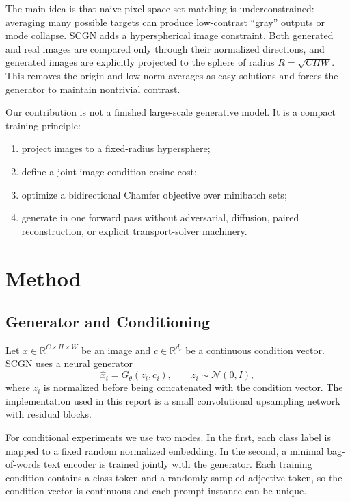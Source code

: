 \documentclass[11pt]{article}
\begin{document}
The main idea is that naive pixel-space set matching is underconstrained:
averaging many possible targets can produce low-contrast ``gray'' outputs or
mode collapse. SCGN adds a hyperspherical image constraint. Both generated and
real images are compared only through their normalized directions, and generated
images are explicitly projected to the sphere of radius
$R=\sqrt{C H W}$. This removes the origin and low-norm averages as easy
solutions and forces the generator to maintain nontrivial contrast.

Our contribution is not a finished large-scale generative model. It is a compact
training principle:
\begin{enumerate}
    \item project images to a fixed-radius hypersphere;
    \item define a joint image-condition cosine cost;
    \item optimize a bidirectional Chamfer objective over minibatch sets;
    \item generate in one forward pass without adversarial, diffusion, paired
    reconstruction, or explicit transport-solver machinery.
\end{enumerate}

\section{Method}
\subsection{Generator and Conditioning}
Let $x \in \mathbb{R}^{C \times H \times W}$ be an image and
$c \in \mathbb{R}^{d_c}$ be a continuous condition vector. SCGN uses a neural
generator
\begin{equation}
    \hat{x}_i = G_\theta(z_i, c_i),
    \qquad z_i \sim \mathcal{N}(0,I),
\end{equation}
where $z_i$ is normalized before being concatenated with the condition vector.
The implementation used in this report is a small convolutional upsampling
network with residual blocks.

For conditional experiments we use two modes. In the first, each class label is
mapped to a fixed random normalized embedding. In the second, a minimal
bag-of-words text encoder is trained jointly with the generator. Each training
condition contains a class token and a randomly sampled adjective token, so the
condition vector is continuous and each prompt instance can be unique.
\end{document}
